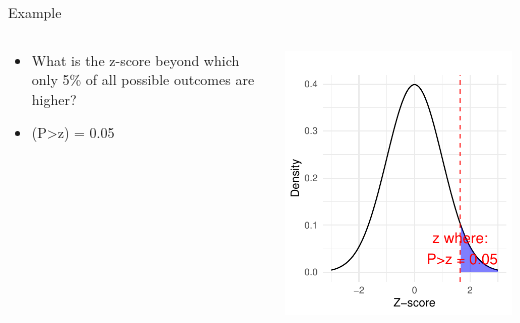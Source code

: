 \documentclass[
  ignorenonframetext,
]{beamer}
\providecommand{\tightlist}{%
  \setlength{\itemsep}{0pt}\setlength{\parskip}{0pt}}
\begin{document}
\begin{frame}{Example}
\label{example-3}
\begin{columns}[T]
\begin{column}{0.5\textwidth}
\vspace{1cm}

\begin{itemize}
\tightlist
\item
  What is the z-score beyond which only 5\% of all possible outcomes are
  higher?
\end{itemize}

\begin{itemize}
\tightlist
\item
  (P\textgreater z) = 0.05
\end{itemize}
\end{column}

\begin{column}{0.5\textwidth}
\vspace{1cm}

\includegraphics{M5-Hypothesis-Testing,-Probability-and-Distribution_files/figure-beamer/unnamed-chunk-18-1.pdf}
\end{column}
\end{columns}
\end{frame}
\end{document}
